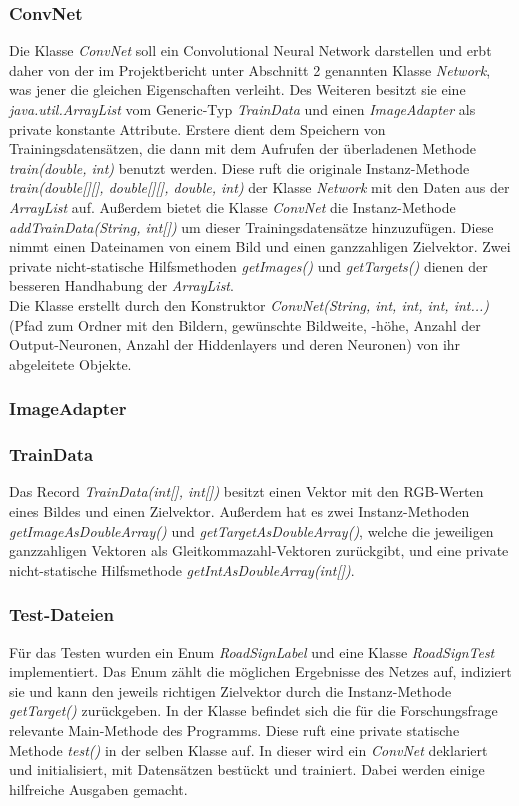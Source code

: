 \documentclass[paper=A4,pagesize=auto,12pt,headinclude=true,footinclude=true,BCOR=0mm,DIV=calc]{scrartcl}
\begin{document}
\subsubsection{ConvNet} %
Die Klasse \textit{ConvNet} soll ein Convolutional Neural Network darstellen und erbt daher von der im Projektbericht \cite{projektbericht} unter Abschnitt 2 genannten Klasse \textit{Network}, was jener die gleichen Eigenschaften verleiht. Des Weiteren besitzt sie eine \textit{java.util.ArrayList} vom Generic-Typ \textit{TrainData} und einen \textit{ImageAdapter} als private konstante Attribute. Erstere dient dem Speichern von Trainingsdatensätzen, die dann mit dem Aufrufen der überladenen Methode \textit{train(double, int)} benutzt werden. Diese ruft die originale Instanz-Methode \textit{train(double[][], double[][], double, int)} der Klasse \textit{Network} mit den Daten aus der \textit{ArrayList} auf.
Außerdem bietet die Klasse \textit{ConvNet} die Instanz-Methode \textit{addTrainData(String, int[])} um dieser Trainingsdatensätze hinzuzufügen. Diese nimmt einen Dateinamen von einem Bild und einen ganzzahligen Zielvektor. Zwei private nicht-statische Hilfsmethoden \textit{getImages()} und \textit{getTargets()} dienen der besseren Handhabung der \textit{ArrayList}.\\
Die Klasse erstellt durch den Konstruktor \textit{ConvNet(String, int, int, int, int...)} (Pfad zum Ordner mit den Bildern, gewünschte Bildweite, -höhe, Anzahl der Output-Neuronen, Anzahl der Hiddenlayers und deren Neuronen) von ihr abgeleitete Objekte.

\subsubsection{ImageAdapter} %

\subsubsection{TrainData}
Das Record \textit{TrainData(int[], int[])} besitzt einen Vektor mit den RGB-Werten eines Bildes und einen Zielvektor. Außerdem hat es zwei Instanz-Methoden \textit{getImageAsDoubleArray()} und \textit{getTargetAsDoubleArray()}, welche die jeweiligen ganzzahligen Vektoren als Gleitkommazahl-Vektoren zurückgibt, und eine private nicht-statische Hilfsmethode \textit{getIntAsDoubleArray(int[])}.

\subsubsection{Test-Dateien} %
Für das Testen wurden ein Enum \textit{RoadSignLabel} und eine Klasse \textit{RoadSignTest} implementiert. Das Enum zählt die möglichen Ergebnisse des Netzes auf, indiziert sie und kann den jeweils richtigen Zielvektor durch die Instanz-Methode \textit{getTarget()} zurückgeben. In der Klasse befindet sich die für die Forschungsfrage relevante Main-Methode des Programms. Diese ruft eine private statische Methode \textit{test()} in der selben Klasse auf. In dieser wird ein \textit{ConvNet} deklariert und initialisiert, mit Datensätzen bestückt und trainiert. Dabei werden einige hilfreiche Ausgaben gemacht.
\end{document}

